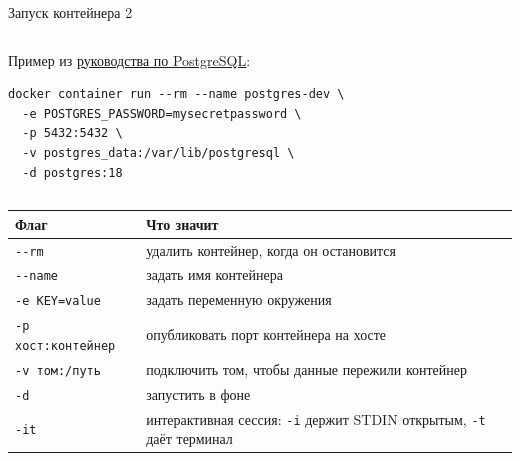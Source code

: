 \documentclass[10pt,aspectratio=169]{beamer}
\newcommand{\ulink}[2]{\href{#1}{\textcolor{blue!60!black}{\underline{#2}}}}
\newcommand{\doclink}[2]{\href{#1}{\textcolor{blue!60!black}{#2}}}
\def\docsline{}
\newcommand{\docs}[1]{\gdef\docsline{Документация: #1}}
\begin{document}
\begin{frame}[fragile]{Запуск контейнера 2}
  \begin{columns}[c]
    \begin{column}{0.66\textwidth}
  Пример из \ulink{https://docs.docker.com/guides/postgresql/}{руководства по PostgreSQL}:
  \begin{lstlisting}
docker container run --rm --name postgres-dev \
  -e POSTGRES_PASSWORD=mysecretpassword \
  -p 5432:5432 \
  -v postgres_data:/var/lib/postgresql \
  -d postgres:18
  \end{lstlisting}
  \vspace{-0.3em}
    \end{column}
    \begin{column}{0.32\textwidth}
    \centering
    \end{column}
  \end{columns}
  \vspace{0.3em}
  \vspace{-0.5em}

  {\footnotesize
  \renewcommand{\arraystretch}{1.15}
  \begin{tabularx}{\textwidth}{|l|X|}
    \hline
    \textbf{Флаг} & \textbf{Что значит} \\ \hline
    \texttt{-{}-rm} & удалить контейнер, когда он остановится \\ \hline
    \texttt{-{}-name} & задать имя контейнера \\ \hline
    \texttt{-e KEY=value} & задать переменную окружения \\ \hline
    \texttt{-p хост:контейнер} & опубликовать порт контейнера на хосте \\ \hline
    \texttt{-v том:/путь} & подключить том, чтобы данные пережили контейнер \\ \hline
    \texttt{-d} & запустить в фоне \\ \hline
    \texttt{-it} & интерактивная сессия: \texttt{-i} держит STDIN открытым, \texttt{-t} даёт терминал \\ \hline
  \end{tabularx}}
  \vfill
  \docs{\doclink{https://docs.docker.com/reference/cli/docker/container/run/\#publish}{\texttt{-{}-publish}}, \doclink{https://docs.docker.com/reference/cli/docker/container/run/\#env}{\texttt{-{}-env}}, \doclink{https://docs.docker.com/guides/postgresql/}{руководство по PostgreSQL}}
\end{frame}
\end{document}
